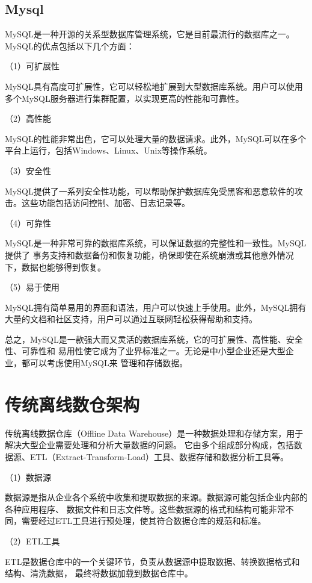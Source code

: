 \subsection{Mysql}

MySQL是一种开源的关系型数据库管理系统，它是目前最流行的数据库之一\cite{42}。MySQL的优点包括以下几个方面：

（1）可扩展性

MySQL具有高度可扩展性，它可以轻松地扩展到大型数据库系统。用户可以使用多个MySQL服务器进行集群配置，以实现更高的性能和可靠性。

（2）高性能

MySQL的性能非常出色，它可以处理大量的数据请求。此外，MySQL可以在多个平台上运行，包括Windows、Linux、Unix等操作系统。

（3）安全性

MySQL提供了一系列安全性功能，可以帮助保护数据库免受黑客和恶意软件的攻击。这些功能包括访问控制、加密、日志记录等。

（4）可靠性

MySQL是一种非常可靠的数据库系统，可以保证数据的完整性和一致性。MySQL提供了
事务支持和数据备份和恢复功能，确保即使在系统崩溃或其他意外情况下，数据也能够得到恢复。

（5）易于使用

MySQL拥有简单易用的界面和语法，用户可以快速上手使用。此外，MySQL拥有大量的文档和社区支持，用户可以通过互联网轻松获得帮助和支持。

总之，MySQL是一款强大而又灵活的数据库系统，它的可扩展性、高性能、安全性、可靠性和
易用性使它成为了业界标准之一。无论是中小型企业还是大型企业，都可以考虑使用MySQL来
管理和存储数据。

\section{传统离线数仓架构}

传统离线数据仓库（Offline Data Warehouse）是一种数据处理和存储方案，用于解决大型企业需要处理和分析大量数据的问题。
它由多个组成部分构成，包括数据源、ETL（Extract-Transform-Load）工具、数据存储和数据分析工具等\cite{27}。

（1）数据源

数据源是指从企业各个系统中收集和提取数据的来源。数据源可能包括企业内部的各种应用程序、
数据文件和日志文件等。这些数据源的格式和结构可能非常不同，需要经过ETL工具进行预处理，使其符合数据仓库的规范和标准。

（2）ETL工具

ETL是数据仓库中的一个关键环节，负责从数据源中提取数据、转换数据格式和结构、清洗数据，
最终将数据加载到数据仓库中。

